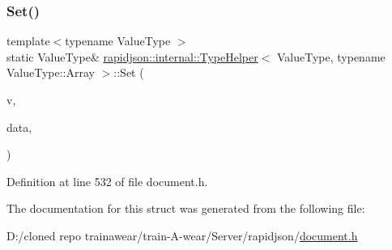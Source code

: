 \subsubsection{\texorpdfstring{Set()}{Set()}\hspace{0.1cm}{\footnotesize\ttfamily [2/2]}}
{\footnotesize\ttfamily template$<$typename Value\+Type $>$ \\
static Value\+Type\& \mbox{\hyperlink{structrapidjson_1_1internal_1_1_type_helper}{rapidjson\+::internal\+::\+Type\+Helper}}$<$ Value\+Type, typename Value\+Type\+::\+Array $>$\+::Set (\begin{DoxyParamCaption}\item[{Value\+Type \&}]{v,  }\item[{\mbox{\hyperlink{structrapidjson_1_1internal_1_1_type_helper_3_01_value_type_00_01typename_01_value_type_1_1_array_01_4_af5f50f560631fef9cfc65b740145947a}{Array\+Type}}}]{data,  }\item[{typename Value\+Type\+::\+Allocator\+Type \&}]{ }\end{DoxyParamCaption})\hspace{0.3cm}{\ttfamily [static]}}



Definition at line 532 of file document.\+h.


\begin{DoxyCode}{0}

\end{DoxyCode}


The documentation for this struct was generated from the following file\+:\begin{DoxyCompactItemize}
\item 
D\+:/cloned repo trainawear/train-\/\+A-\/wear/\+Server/rapidjson/\mbox{\hyperlink{document_8h}{document.\+h}}\end{DoxyCompactItemize}
